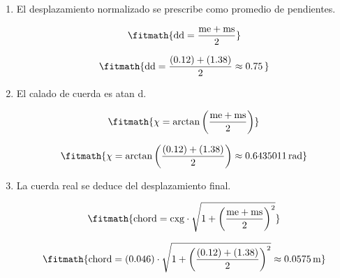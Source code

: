 \begin{enumerate}

\item El desplazamiento normalizado se prescribe como promedio de pendientes.

\[\fitmath{\mathrm{dd}=\frac{\mathrm{me}+\mathrm{ms}}{2}}\]

\[\fitmath{\mathrm{dd}=\frac{(0.12)+(1.38)}{2}\approx 0.75\,}\]

\item El calado de cuerda es atan d.

\[\fitmath{\chi=\arctan\left(\frac{\mathrm{me}+\mathrm{ms}}{2}\right)}\]

\[\fitmath{\chi=\arctan\left(\frac{(0.12)+(1.38)}{2}\right)\approx 0.6435011\,\mathrm{rad}}\]

\item La cuerda real se deduce del desplazamiento final.

\[\fitmath{\mathrm{chord}=\mathrm{cxg}\cdot \sqrt{1+{\left(\frac{\mathrm{me}+\mathrm{ms}}{2}\right)}^{2}}}\]

\[\fitmath{\mathrm{chord}=(0.046)\cdot \sqrt{1+{\left(\frac{(0.12)+(1.38)}{2}\right)}^{2}}\approx 0.0575\,\mathrm{m}}\]

\end{enumerate}
